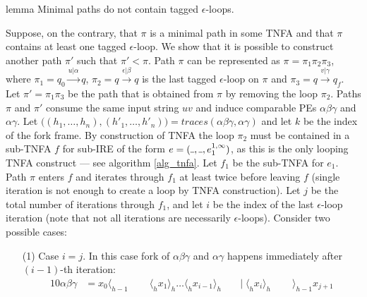 \documentclass[AMA,STIX1COL]{WileyNJD-v2}
\newcommand{\Xl}{\langle}
\newcommand{\Xr}{\rangle}
\newcommand{\Xund}{\rule{.4em}{.4pt}}
\begin{document}
\begin{theoremEnd}[restate, no link to proof, no link to theorem, category=lemmata_closure]{lemma}
    \label{lemma_closure_minpaths}
    Minimal paths do not contain tagged $\epsilon$-loops.
\end{theoremEnd}
\begin{proofEnd}
    Suppose, on the contrary, that $\pi$ is a minimal path in some TNFA
    and that $\pi$ contains at least one tagged $\epsilon$-loop.
    We show that it is possible to construct another path $\pi'$ such that $\pi' < \pi$.
    Path $\pi$ can be represented as
    $\pi = \pi_1 \pi_2 \pi_3$, where
    $\pi_1 = q_0 \overset {u | \alpha} {\longrightarrow} q$,
    $\pi_2 = q \overset {\epsilon | \beta} {\longrightarrow} q$ is the last tagged $\epsilon$-loop on $\pi$ and
    $\pi_3 = q \overset {v | \gamma} {\longrightarrow} q_f$.
    Let $\pi' = \pi_1 \pi_3$ be the path that is obtained from $\pi$ by removing the loop $\pi_2$.
    Paths $\pi$ and $\pi'$ consume the same input string $uv$
    and induce comparable PEs $\alpha \beta \gamma$ and $\alpha \gamma$.
    Let $\big( (h_1, \hdots, h_n), (h'_1, \hdots, h'_n) \big) = traces (\alpha \beta \gamma, \alpha \gamma)$
    and let $k$ be the index of the fork frame.
    By construction of TNFA the loop $\pi_2$ must be contained in a sub-TNFA $f$
    for sub-IRE of the form $e = (\Xund, \Xund, e_1^{1,\infty})$,
    as this is the only looping TNFA construct --- see algorithm \ref{alg_tnfa}.
    Let $f_1$ be the sub-TNFA for $e_1$.
    Path $\pi$ enters $f$ and iterates through $f_1$ at least twice before leaving $f$
    (single iteration is not enough to create a loop by TNFA construction).
    Let $j$ be the total number of iterations through $f_1$,
    and let $i$ be the index of the last $\epsilon$-loop iteration
    (note that not all iterations are necessarily $\epsilon$-loops).
    Consider two possible cases:
    \begin{enumerate}[itemsep=0.2em, topsep=0.5em]
    \item[(1)]
        Case $i = j$.
        In this case fork of $\alpha \beta \gamma$ and $\alpha \gamma$ happens immediately after $(i-1)$-th iteration:
        \begin{alignat*}{10}
            \alpha \beta \gamma &= x_0 \Xl_{h-1} \;&&\; \Xl_h x_1 \Xr_h \hdots \Xl_h x_{i-1} \Xr_h \;&&\big|\; \Xl_h x_{i} \Xr_h \;&&\; \Xr_{h-1} x_{j+1} \\[-0.5em]

\end{alignat*}
\end{enumerate}
\end{proofEnd}
\end{document}

